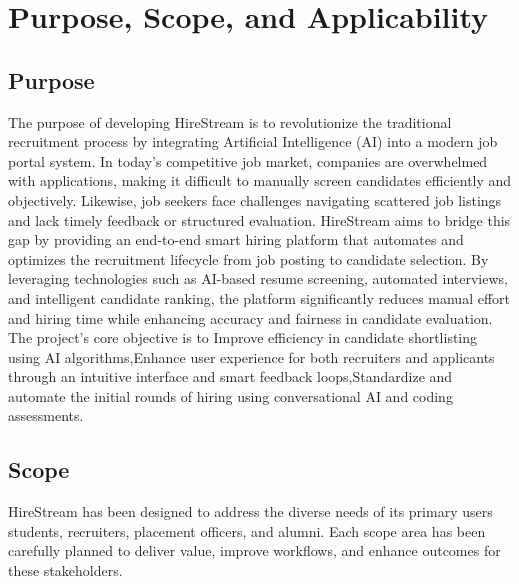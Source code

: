 \documentclass[a4paper, 12pt]{report}
\begin{document}
\section{Purpose, Scope, and Applicability}

\subsection{Purpose}
The purpose of developing HireStream is to revolutionize the traditional recruitment process by integrating Artificial Intelligence (AI) into a modern job portal system. In today’s competitive job market, companies are overwhelmed with applications, making it difficult to manually screen candidates efficiently and objectively. Likewise, job seekers face challenges navigating scattered job listings and lack timely feedback or structured evaluation.
HireStream aims to bridge this gap by providing an end-to-end smart hiring platform that automates and optimizes the recruitment lifecycle from job posting to candidate selection. By leveraging technologies such as AI-based resume screening, automated interviews, and intelligent candidate ranking, the platform significantly reduces manual effort and hiring time while enhancing accuracy and fairness in candidate evaluation.
The project’s core objective is to Improve efficiency in candidate shortlisting using AI algorithms,Enhance user experience for both recruiters and applicants through an intuitive interface and smart feedback loops,Standardize and automate the initial rounds of hiring using conversational AI and coding assessments.

\subsection{Scope}
HireStream has been designed to address the diverse needs of its primary users students, recruiters, placement officers, and alumni. Each scope area has been carefully planned to deliver value, improve workflows, and enhance outcomes for these stakeholders.
\end{document}
